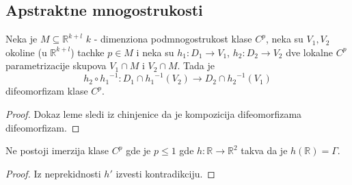 \documentclass[a4paper,12pt]{article}
\newcommand{\RR}{\mathbb{R}}
\begin{document}
\subsection{Apstraktne mnogostrukosti}

\begin{lema}
Neka je $M \subseteq \RR^{k+l}$ $k$ - dimenziona podmnogostrukost klase $C^p$, neka su $V_1, V_2$ okoline (u $\RR^{k+l}$) tachke $p \in M$ i neka su $h_1 : D_1 \to V_1$, $h_2: D_2 \to V_2$ dve lokalne $C^p$ parametrizacije skupova $V_1 \cap M$ i $V_2 \cap M$. Tada je
\[h_2 \circ {h_1}^{-1} : D_1 \cap {h_1}^{-1}(V_2) \to D_2 \cap {h_2}^{-1}(V_1)\]
difeomorfizam klase $C^p$.
\end{lema}
\begin{proof}
Dokaz leme sledi iz chinjenice da je kompozicija difeomorfizama difeomorfizam.
\end{proof}

\begin{tvr}
Ne postoji imerzija klase $C^p$ gde je $p \leq 1$ gde $h: \RR \to \RR^2$ takva da je $h(\RR) = \Gamma$.
\end{tvr}
\begin{proof}
Iz neprekidnosti $h'$ izvesti kontradikciju.
\end{proof}
\end{document}
